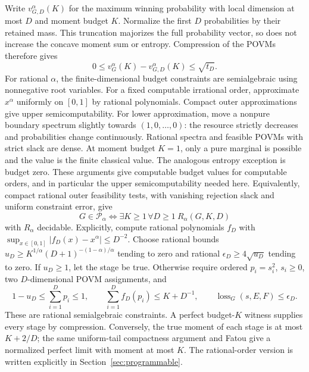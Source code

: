 Write $v_{G,D}^\alpha(K)$ for the maximum winning probability with local dimension at most $D$ and moment budget $K$. Normalize the first $D$ probabilities by their retained mass. This
truncation majorizes the full probability vector, so does not increase
the concave moment sum or entropy. Compression of the POVMs therefore
gives
\[
 0\le v_G^\alpha(K)-v_{G,D}^\alpha(K)\le\sqrt{t_D}.
\]
For rational $\alpha$, the finite-dimensional budget constraints are
semialgebraic using nonnegative root variables. For a fixed computable
irrational order, approximate $x^\alpha$ uniformly on $[0,1]$ by rational
polynomials. Compact outer approximations give upper semicomputability.
For lower approximation, move a nonpure boundary spectrum slightly
towards $(1,0,\ldots,0)$: the resource strictly decreases and probabilities
change continuously. Rational spectra and feasible POVMs with strict
slack are dense. At moment budget $K=1$, only a pure marginal is possible
and the value is the finite classical value. The analogous entropy
exception is budget zero. These arguments give computable budget values
for computable orders, and in particular the upper semicomputability
needed here. Equivalently, compact rational outer feasibility tests,
with vanishing rejection slack and uniform constraint error, give
\[
 G\in\mathcal P_\alpha\iff\exists K\ge1\,\forall D\ge1\ R_\alpha(G,K,D)
\]
with $R_\alpha$ decidable. Explicitly, compute rational polynomials $f_D$ with
$\sup_{x\in[0,1]}|f_D(x)-x^\alpha|\le D^{-2}$.
Choose rational bounds $u_D\ge K^{1/\alpha}(D+1)^{-(1-\alpha)/\alpha}$ tending to zero
and rational $\epsilon_D\ge4\sqrt{u_D}$ tending to zero. If $u_D\ge1$, let the stage be true.
Otherwise require ordered $p_i=s_i^2$, $s_i\ge0$, two $D$-dimensional POVM assignments, and
\[
 1-u_D\le\sum_{i=1}^D p_i\le1,\qquad
 \sum_{i=1}^D f_D(p_i)\le K+D^{-1},\qquad
 \operatorname{loss}_G(s,E,F)\le\epsilon_D.
\]
These are rational semialgebraic constraints. A perfect budget-$K$ witness supplies every stage by compression.
Conversely, the true moment of each stage is at most $K+2/D$; the same uniform-tail compactness argument
and Fatou give a normalized perfect limit with moment at most $K$.
The rational-order version is written explicitly in
Section~\ref{sec:programmable}.

